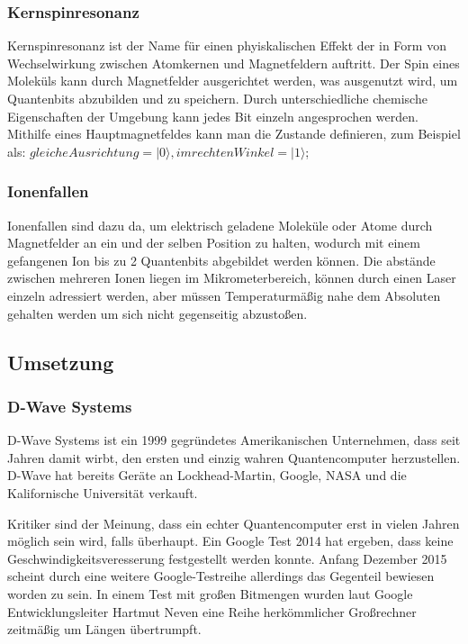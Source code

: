 \subsubsection{Kernspinresonanz}
\label{sec:kernspinresonanz}

Kernspinresonanz ist der Name für einen phyiskalischen Effekt der in Form von Wechselwirkung zwischen Atomkernen und Magnetfeldern auftritt. Der Spin eines Moleküls kann durch Magnetfelder ausgerichtet werden, was ausgenutzt wird, um Quantenbits abzubilden und zu speichern. Durch unterschiedliche chemische Eigenschaften der Umgebung kann jedes Bit einzeln angesprochen werden. Mithilfe eines Hauptmagnetfeldes kann man die Zustande definieren, zum Beispiel als: $gleiche Ausrichtung = |0\rangle, im rechten Winkel = |1\rangle$;

\subsubsection{Ionenfallen}
\label{sec:ionenfallen}

Ionenfallen sind dazu da, um elektrisch geladene Moleküle oder Atome durch Magnetfelder an ein und der selben Position zu halten, wodurch mit einem gefangenen Ion bis zu 2 Quantenbits abgebildet werden können. Die abstände zwischen mehreren Ionen liegen im Mikrometerbereich, können durch einen Laser einzeln adressiert werden, aber müssen Temperaturmäßig nahe dem Absoluten gehalten werden um sich nicht gegenseitig abzustoßen.

\subsection{Umsetzung}
\label{sec:umsetzung}

\subsubsection{D-Wave Systems}
\label{sec:dwave}

D-Wave Systems ist ein 1999 gegründetes Amerikanischen Unternehmen, dass seit Jahren damit wirbt, den ersten und einzig wahren Quantencomputer herzustellen. D-Wave hat bereits Geräte an Lockhead-Martin, Google, NASA und die Kalifornische Universität verkauft.

Kritiker sind der Meinung, dass ein echter Quantencomputer erst in vielen Jahren möglich sein wird, falls überhaupt. Ein Google Test 2014 hat ergeben, dass keine Geschwindigkeitsveresserung festgestellt werden konnte. Anfang Dezember 2015 scheint durch eine weitere Google-Testreihe allerdings das Gegenteil bewiesen worden zu sein. In einem Test mit großen Bitmengen wurden laut Google Entwicklungsleiter Hartmut Neven eine Reihe herkömmlicher Großrechner zeitmäßig um Längen übertrumpft.

